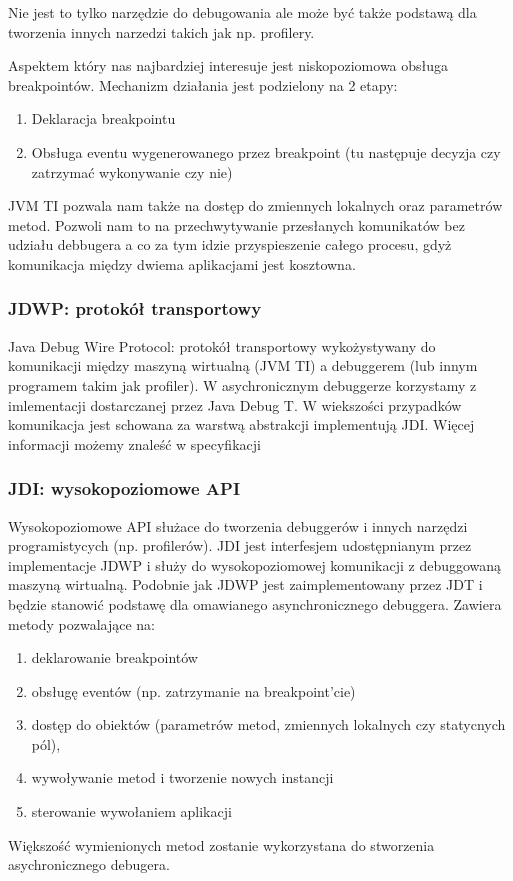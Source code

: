 Nie jest to tylko narzędzie do debugowania ale może być także podstawą dla tworzenia innych narzedzi takich jak np. profilery.

Aspektem który nas najbardziej interesuje jest niskopoziomowa obsługa breakpointów. Mechanizm działania jest podzielony na 2 etapy:

\begin{enumerate}
\item Deklaracja breakpointu
\item Obsługa eventu wygenerowanego przez breakpoint (tu następuje decyzja czy zatrzymać wykonywanie czy nie)
\end{enumerate}
JVM TI pozwala nam także na dostęp do zmiennych lokalnych oraz parametrów metod. Pozwoli nam to na przechwytywanie przesłanych komunikatów bez udziału debbugera a co za tym idzie przyspieszenie całego procesu, gdyż komunikacja między dwiema aplikacjami jest kosztowna.


\subsubsection{JDWP: protokół transportowy}

Java Debug Wire Protocol: protokół transportowy wykożystywany do komunikacji między maszyną wirtualną (JVM TI) a debuggerem (lub innym programem takim jak profiler). W asychronicznym debuggerze korzystamy z imlementacji dostarczanej przez Java Debug T. W wiekszości przypadków komunikacja jest schowana za warstwą abstrakcji implementują JDI. Więcej informacji możemy znaleść w specyfikacji\cite{jwdpSpec}

\subsubsection{JDI: wysokopoziomowe API}

Wysokopoziomowe API służace do tworzenia debuggerów i innych narzędzi programistycych (np. profilerów). JDI jest interfesjem udostępnianym przez implementacje JDWP i służy do wysokopoziomowej komunikacji z debuggowaną maszyną wirtualną. Podobnie jak JDWP jest zaimplementowany przez JDT i będzie stanowić podstawę dla omawianego asynchronicznego debuggera.
Zawiera metody pozwalające na: \begin{enumerate}
\item deklarowanie breakpointów
\item obsługę eventów (np. zatrzymanie na breakpoint'cie)
\item dostęp do obiektów (parametrów metod, zmiennych lokalnych czy statycnych pól),
\item wywoływanie metod i tworzenie nowych instancji
\item sterowanie wywołaniem aplikacji
\end{enumerate} Większość wymienionych metod zostanie wykorzystana do stworzenia asychronicznego debugera.


